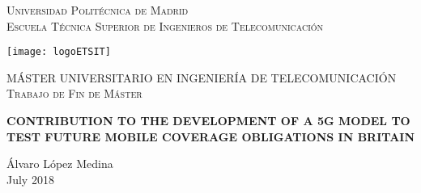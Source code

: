 \makeatletter



\def\@department{Señales, Sistemas y Radiocomunicaciones}
\def\@university{Universidad Politécnica de Madrid}
\def\@school{Escuela Técnica Superior de Ingenieros de Telecomunicación}

\def\@author{Álvaro López Medina}
\def\@tutor{Dña. Zoraida Frías Barroso}
\def\@advisor{Dña. Zoraida Frías Barroso}

\def\@presidente{....................................................}
\def\@vocal{....................................................}
\def\@secretario{....................................................}
\def\@suplente{....................................................}

\def\@logo{logoETSIT}
\def\@title{CONTRIBUTION TO THE DEVELOPMENT OF A 5G MODEL TO TEST FUTURE MOBILE COVERAGE OBLIGATIONS IN BRITAIN}
\def\@degree{MÁSTER UNIVERSITARIO EN INGENIERÍA DE TELECOMUNICACIÓN}
\def\@tfm{Trabajo de Fin de Máster}
\def\@miembros{Miembros del tribunal}
\def\@date{July 2018} 

\pagestyle{empty}
\addtolength{\oddsidemargin}{-1cm}
\addtolength{\evensidemargin}{-1cm}


\begin{titlepage}
\begin{center}

{\centering\scshape\setlength{\parindent}{0cm} \normalsize \@university\\[5mm]}
{\centering\scshape\setlength{\parindent}{0cm} \normalsize \@school\\[10mm]}

\texttt{[image: logoETSIT]}
\vspace{1cm}

{\Large \centering \scshape \@degree\\[2cm]}
{\LARGE \centering \scshape \@tfm\\[2cm]}

{\LARGE \bfseries \@title \\[3cm]}

{\large\sc \@author \\[0.5cm]}
{\large\sc \@date}\\

\end{center}
\end{titlepage}

